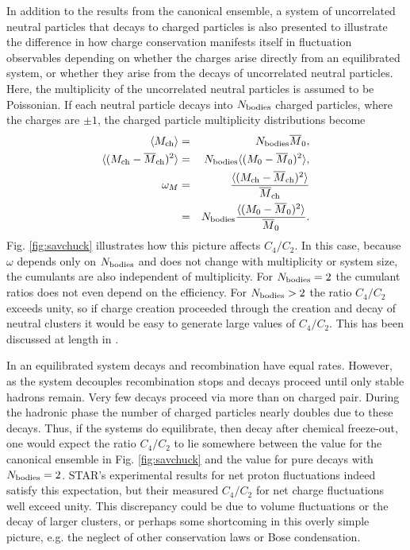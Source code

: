 In addition to the results from the canonical ensemble, a system of uncorrelated neutral particles that decays to charged particles is also presented to illustrate the difference in how charge conservation manifests itself in fluctuation observables depending on whether the charges arise directly from an equilibrated system, or whether they arise from the decays of uncorrelated neutral particles. Here, the multiplicity of the uncorrelated neutral particles is assumed to be Poissonian. If each neutral particle decays into $N_{\rm bodies}$ charged particles, where the charges are $\pm 1$, the charged particle multiplicity distributions become 
\begin{eqnarray}
\langle M_{\rm ch}\rangle&=&N_{\rm bodies}\overline{M}_0,\\
\nonumber
\langle(M_{\rm ch}-\overline{M}_{\rm ch})^2\rangle&=&N_{\rm bodies}\langle(M_0-\overline{M}_0)^2\rangle,\\
\nonumber
\omega_M&=&\frac{\langle(M_{\rm ch}-\overline{M}_{\rm ch})^2\rangle}{\overline{M}_{\rm ch}}\\
\nonumber
&=&N_{\rm bodies}\frac{\langle(M_0-\overline{M}_0)^2\rangle}{\overline{M}_0}.
\end{eqnarray}
Fig. \ref{fig:savchuck} illustrates how this picture affects $C_4/C_2$. In this case, because $\omega$ depends only on $N_{\rm bodies}$ and does not change with multiplicity or system size, the cumulants are also independent of multiplicity. For $N_{\rm bodies}=2$ the cumulant ratios does not even depend on the efficiency. For $N_{\rm bodies}>2$ the ratio $C_4/C_2$ exceeds unity, so if charge creation proceeded through the creation and decay of neutral clusters it would be easy to generate large values of $C_4/C_2$. This has been discussed at length in \cite{Bzdak:2018uhv}.

In an equilibrated system decays and recombination have equal rates. However, as the system decouples recombination stops and decays proceed until only stable hadrons remain. Very few decays proceed via more than on charged pair. During the hadronic phase the number of charged particles nearly doubles due to these decays. Thus, if the systems do equilibrate, then decay after chemical freeze-out, one would expect the ratio $C_4/C_2$ to lie somewhere between the value for the canonical ensemble in Fig. \ref{fig:savchuck} and the value for pure decays with $N_{\rm bodies}=2$. STAR's experimental results for net proton fluctuations indeed satisfy this expectation, but their measured $C_4/C_2$ for net charge fluctuations well exceed unity. This discrepancy could be due to volume fluctuations or the decay of larger clusters, or perhaps some shortcoming in this overly simple picture, e.g. the neglect of other conservation laws or Bose condensation. 

